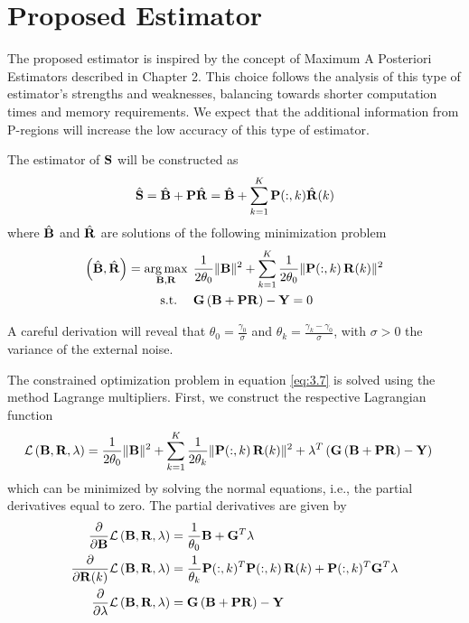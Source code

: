 \section{Proposed Estimator}

The proposed estimator is inspired by the concept of Maximum A Posteriori Estimators described in Chapter 2.
%
This choice follows the analysis of this type of estimator's strengths and weaknesses, balancing towards shorter computation times and memory requirements.
%
We expect that the additional information from P-regions will increase the low accuracy of this type of estimator.

The estimator of $\mathbf{S}$ will be constructed as 
\begin{equation}
    \hat{\mathbf{S}} = \hat{\mathbf{B}} + \mathbf{P} \hat{\mathbf{R}}
    = \hat{\mathbf{B}} + \sum_{k=1}^K \mathbf{P}(:,k) \hat{\mathbf{R}}(k)
    \label{eq:3.7_v2}
\end{equation}
where $\hat{\mathbf{B}}$ and $\hat{\mathbf{R}}$ are solutions of the following minimization problem
\begin{align}
    \left(  \hat{\mathbf{B}}, \hat{\mathbf{R}}  \right) 
    =
    \operatorname*{arg\,max}_{\mathbf{B}, \mathbf{R} }\, 
    &\phantom{.}
    \frac{1}{2 \theta_0} \lVert \mathbf{B} \rVert^2
    +
    \sum_{k=1}^K \frac{1}{2 \theta_0} \lVert \mathbf{P}(:,k)\, \mathbf{R}(k) \rVert^2
    \nonumber \\
    \text{s.t.}
    \quad
    &\phantom{.}
    {\mathbf{G} \left( \mathbf{B} + \mathbf{P} \mathbf{R} \right) } - \mathbf{Y} = 0
    \label{eq:3.7}
\end{align}

A careful derivation will reveal that $\theta_0 = \frac{\gamma_0 }{\sigma}$ and $\theta_k = \frac{\gamma_k-\gamma_0}{\sigma}$, with $\sigma>0$ the variance of the external noise.
%

The constrained optimization problem in equation \eqref{eq:3.7} is solved using the method Lagrange multipliers.
%
First, we construct the respective Lagrangian function
\begin{align}
    \mathcal{L}\left( \mathbf{B}, \mathbf{R}, \lambda \right) &=
    \frac{1}{2 \theta_0} \lVert \mathbf{B} \rVert^2
    +
    \sum_{k=1}^K \frac{1}{2 \theta_k} \lVert \mathbf{P}(:,k)\, \mathbf{R}(k) \rVert^2
    +
    \lambda^T \left( {\mathbf{G} \left( \mathbf{B} + \mathbf{P} \mathbf{R} \right) } - \mathbf{Y} \right)
\end{align}
which can be minimized by solving the normal equations, i.e., the partial derivatives equal to zero.
%
The partial derivatives are given by
\begin{align}
    \frac{\partial}{\partial \mathbf{B}} \mathcal{L}\left( \mathbf{B}, \mathbf{R}, \lambda \right)
    &=
    \frac{1}{\theta_0} \mathbf{B} + \mathbf{G}^T \lambda 
    \label{eq:3.9}
    \\
    \frac{\partial}{\partial \mathbf{R}(k)} \mathcal{L}\left( \mathbf{B}, \mathbf{R}, \lambda \right)
    &=
    \frac{1}{\theta_k} \mathbf{P}(:,k)^T \mathbf{P}(:,k)\, \mathbf{R}(k) + \mathbf{P}(:,k)^T \mathbf{G}^T \lambda 
    \label{eq:3.10}
    \\
    \frac{\partial}{\partial \lambda} \mathcal{L}\left( \mathbf{B}, \mathbf{R}, \lambda \right)
    &=
    \mathbf{G} \left(  \mathbf{B} + \mathbf{P} \mathbf{R}  \right) - \mathbf{Y}
    \label{eq:3.11}
\end{align}

